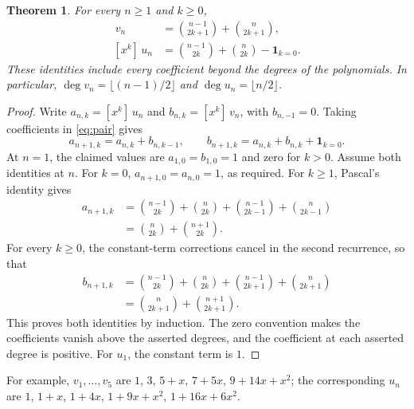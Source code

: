 \documentclass[11pt]{article}
\newtheorem{theorem}{Theorem}
\newcommand{\coeff}[2]{[x^{#1}]\,#2}
\begin{document}
\begin{theorem}\label{thm:coefficients}
For every $n\geq1$ and $k\geq0$,
\begin{align}
\coeff{k}{v_n}&=\binom{n-1}{2k+1}+\binom n{2k+1},\label{eq:odd}\\
\coeff{k}{u_n}&=\binom{n-1}{2k}+\binom n{2k}-\mathbf1_{k=0}.
\label{eq:even}
\end{align}
These identities include every coefficient beyond the degrees of the
polynomials. In particular,
$\deg v_n=\lfloor(n-1)/2\rfloor$ and $\deg u_n=\lfloor n/2\rfloor$.
\end{theorem}

\begin{proof}
Write $a_{n,k}=\coeff{k}{u_n}$ and $b_{n,k}=\coeff{k}{v_n}$,
with $b_{n,-1}=0$. Taking coefficients in \eqref{eq:pair} gives
\begin{equation}\label{eq:coeff-rec}
a_{n+1,k}=a_{n,k}+b_{n,k-1},\qquad
b_{n+1,k}=a_{n,k}+b_{n,k}+\mathbf1_{k=0}.
\end{equation}
At $n=1$, the claimed values are $a_{1,0}=b_{1,0}=1$ and zero
for $k>0$. Assume both identities at $n$. For $k=0$,
$a_{n+1,0}=a_{n,0}=1$, as required. For $k\geq1$, Pascal's identity gives
\begin{align*}
a_{n+1,k}
&=\binom{n-1}{2k}+\binom n{2k}
 +\binom{n-1}{2k-1}+\binom n{2k-1}\\
&=\binom n{2k}+\binom{n+1}{2k}.
\end{align*}
For every $k\geq0$, the constant-term corrections cancel in the second
recurrence, so that
\begin{align*}
b_{n+1,k}
&=\binom{n-1}{2k}+\binom n{2k}
 +\binom{n-1}{2k+1}+\binom n{2k+1}\\
&=\binom n{2k+1}+\binom{n+1}{2k+1}.
\end{align*}
This proves both identities by induction. The zero convention makes the
coefficients vanish above the asserted degrees, and the coefficient at
each asserted degree is positive. For $u_1$, the constant term is $1$.
\end{proof}

For example, $v_1,\ldots,v_5$ are
$1$, $3$, $5+x$, $7+5x$, $9+14x+x^2$; the corresponding $u_n$ are
$1$, $1+x$, $1+4x$, $1+9x+x^2$, $1+16x+6x^2$.
\end{document}
